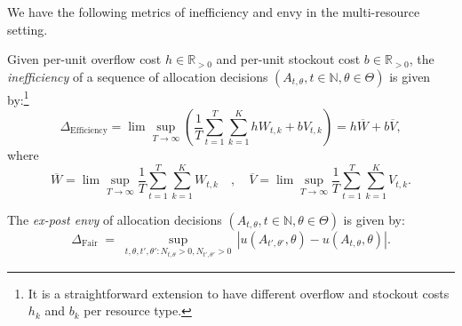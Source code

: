 \documentclass[mnsc,nonblindrev]{informs3}
\newcommand{\N}{\mathbb{N}}
\newcommand{\Deff}{\Delta_{\text{Efficiency}}\xspace}
\newcommand{\Dfair}{\Delta_{\text{Fair}}\xspace}
\begin{document}
We have the following metrics of inefficiency and envy in the multi-resource setting.
\begin{definition}[Inefficiency]
\label{def:efficiency_multi}
Given per-unit overflow cost $h \in \mathbb{R}_{> 0}$ and per-unit stockout cost $b \in \mathbb{R}_{> 0}$, the \emph{inefficiency} of a sequence of allocation decisions $(A_{t,\theta}, t\in \N, \theta\in\Theta)$ is given by:\footnote{It is a straightforward extension to have different overflow and stockout costs $h_k$ and $b_k$ per resource type.}
\begin{equation*}
\Deff = \lim \sup_{T \rightarrow \infty} \left( \frac{1}{T} \sum_{t=1}^T \sum_{k=1}^K hW_{t,k} + bV_{t,k} \right) =  h\overline{W} + b\overline{V},
\end{equation*}
where
\begin{equation*}
\overline{W} = \lim \sup_{T \rightarrow \infty} \frac{1}{T} \sum_{t=1}^T \sum_{k=1}^K W_{t,k} \quad,\quad \overline{V} = \lim  \sup_{T \rightarrow \infty} \frac{1}{T} \sum_{t=1}^T \sum_{k=1}^K V_{t,k}.
\end{equation*}
\end{definition}

\smallskip 

\begin{definition}
\label{def:fairness_multi}
The \emph{ex-post envy} of allocation decisions \mbox{$(A_{t,\theta}, t\in \N, \theta\in\Theta)$} is given by:
\begin{equation*}
\Dfair \;=\; \sup_{t,\theta, t', \theta': N_{t, \theta} > 0, N_{t', \theta'} > 0} \, | u(A_{t', \theta'}, \theta) - u(A_{t,\theta}, \theta)|.
\end{equation*}
\end{definition}
\end{document}
